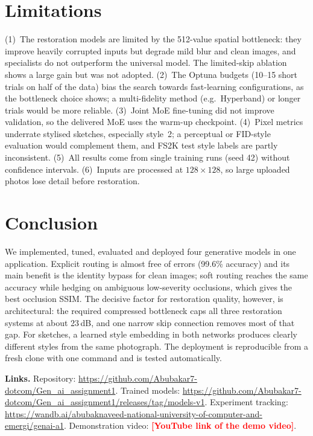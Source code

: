 \documentclass[conference]{IEEEtran}
\newcommand{\TODO}[1]{\textcolor{red}{\textbf{[#1]}}}
\newcommand{\youtubeurl}{\TODO{YouTube link of the demo video}}
\newcommand{\repourl}{\url{https://github.com/Abubakar7-dotcom/Gen_ai_assignment1}}
\newcommand{\releaseurl}{\url{https://github.com/Abubakar7-dotcom/Gen_ai_assignment1/releases/tag/models-v1}}
\newcommand{\wandburl}{\url{https://wandb.ai/abubaknaveed-national-university-of-computer-and-emergi/genai-a1}}
\begin{document}
\section{Limitations}\label{sec:limits}
(1)~The restoration models are limited by the 512-value spatial bottleneck: they improve heavily corrupted inputs but
degrade mild blur and clean images, and specialists do not outperform the universal model. The limited-skip ablation
shows a large gain but was not adopted. (2)~The Optuna budgets (10--15 short trials on half of the data) bias the
search towards fast-learning configurations, as the bottleneck choice shows; a multi-fidelity method (e.g.\
Hyperband) or longer trials would be more reliable. (3)~Joint MoE fine-tuning did not improve validation, so the
delivered MoE uses the warm-up checkpoint. (4)~Pixel metrics underrate stylised sketches, especially style~2; a
perceptual or FID-style evaluation would complement them, and FS2K test style labels are partly inconsistent.
(5)~All results come from single training runs (seed 42) without confidence intervals. (6)~Inputs are processed at
$128\times128$, so large uploaded photos lose detail before restoration.

\section{Conclusion}
We implemented, tuned, evaluated and deployed four generative models in one application. Explicit routing is
almost free of errors (99.6\% accuracy) and its main benefit is the identity bypass for clean images; soft routing
reaches the same accuracy while hedging on ambiguous low-severity occlusions, which gives the best occlusion SSIM.
The decisive factor for restoration quality, however, is architectural: the required compressed bottleneck caps all
three restoration systems at about 23\,dB, and one narrow skip connection removes most of that gap. For sketches, a
learned style embedding in both networks produces clearly different styles from the same photograph. The deployment
is reproducible from a fresh clone with one command and is tested automatically.

\textbf{Links.} Repository: \repourl. Trained models: \releaseurl. Experiment tracking: \wandburl.
Demonstration video: \youtubeurl.
\end{document}
